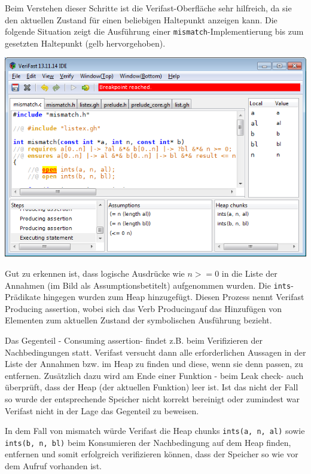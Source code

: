 Beim Verstehen dieser Schritte ist die Verifast-Oberfläche sehr hilfreich, da sie den aktuellen
Zustand für einen beliebigen Haltepunkt anzeigen kann. Die folgende Situation zeigt die Ausführung
einer \lstinline{mismatch}-Implementierung bis zum gesetzten Haltepunkt (gelb hervorgehoben).

\begin{center}
\includegraphics[width=1.0\textwidth]{images/verifast-state-after-precondition.png}
\end{center}

Gut zu erkennen ist, dass logische Ausdrücke wie \(n >= 0\) in die Liste der Annahmen 
(im Bild als \glqq Assumptions\grqq betitelt) aufgenommen wurden. Die \lstinline{ints}-Prädikate hingegen
wurden zum Heap hinzugefügt. Diesen Prozess nennt Verifast \glqq Producing assertion\grqq, wobei sich das Verb
\glqq Producing\grqq auf das Hinzufügen von Elementen zum aktuellen Zustand der symbolischen Ausführung
bezieht.

Das Gegenteil - \glqq Consuming assertion\grqq - findet z.B. beim Verifizieren der Nachbedingungen statt.
Verifast versucht dann alle erforderlichen Aussagen in der Liste der Annahmen bzw. im Heap zu finden
und diese, wenn sie denn passen, zu entfernen. Zusätzlich dazu wird am Ende einer Funktion - beim 
\glqq Leak check\grqq - auch überprüft, dass der Heap (der aktuellen Funktion) leer ist. Ist das nicht 
der Fall so wurde der entsprechende Speicher nicht korrekt bereinigt oder zumindest war Verifast nicht 
in der Lage das Gegenteil zu beweisen.

In dem Fall von mismatch würde Verifast die Heap chunks \lstinline{ints(a, n, al)} sowie
\lstinline{ints(b, n, bl)} beim Konsumieren der Nachbedingung auf dem Heap finden, entfernen und
somit erfolgreich verifizieren können, dass der Speicher so wie vor dem Aufruf vorhanden ist.



